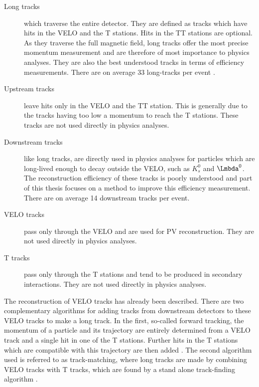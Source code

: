 \begin{description}
\item[Long tracks] which traverse the entire detector. They are defined as tracks which have hits in the VELO and the T stations. Hits in the TT stations are optional. As they traverse the full magnetic field, long tracks offer the most precise momentum measurement and are therefore of most importance to physics analyses. They are also the best understood tracks in terms of efficiency measurements. There are on average 33 long-tracks per event \cite{uksem}. 

\item[Upstream tracks] leave hits only in the VELO and the TT station. This is generally due to the tracks having too low a momentum to reach the T stations. These tracks are not used directly in physics analyses.

\item [Downstream tracks] like long tracks, are directly used in physics analyses for particles which are long-lived enough to decay outside the VELO, such as $K^{0}_{s}$ and $\Lz$. The reconstruction efficiency of these tracks is poorly understood and part of this thesis focuses on a method to improve this efficiency measurement. There are on average 14 downstream tracks per event.
\item [VELO tracks] pass only through the VELO and are used for PV reconstruction. They are not used directly in physics analyses.
\item[T tracks] pass only through the T stations and tend to be produced in secondary interactions. They are not used directly in physics analyses.  %
\end{description}

The reconstruction of VELO tracks has already been described. There are two complementary algorithms for adding tracks from downstream detectors to these VELO tracks to make a long track. In the first, so-called forward tracking, the momentum of a particle and its trajectory are entirely determined from a VELO track and a single hit in one of the T stations. Further hits in the T stations which are compatible with this trajectory are then added \cite{forward}. The second algorithm used is referred to as track-matching, where long tracks are made by combining VELO tracks with T tracks, which are found by a stand alone track-finding algorithm \cite{patseed}.


